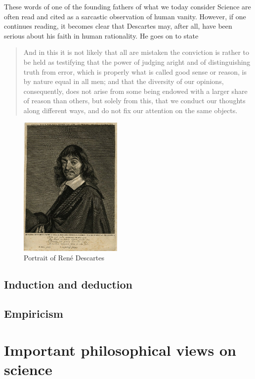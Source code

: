 \documentclass{tufte-book}
\begin{document}
These words of one of the founding fathers of what we today consider Science are often read and cited as a sarcastic observation of human vanity. However, if one continues reading, it becomes clear that Descartes may, after all, have been serious about his faith in human rationality. He goes on to state

\begin{quote}
And in this it is not likely that all are mistaken the conviction is rather to be held as testifying that the power of judging aright and of distinguishing truth from error, which is properly what is called good sense or reason, is by nature equal in all men; and that the diversity of our opinions, consequently, does not arise from some being endowed with a larger share of reason than others, but solely from this, that we conduct our thoughts along different ways, and do not fix our attention on the same objects. 
\end{quote}


\begin{figure}[]
\begin{center}
\includegraphics[width=5cm]{figures/Descartes}
\caption{Portrait of René Descartes}
\label{fig: Descartes}
\end{center}
\end{figure}



\subsection{Induction and deduction}

\subsection{Empiricism}


\section{Important philosophical views on science}
\end{document}
